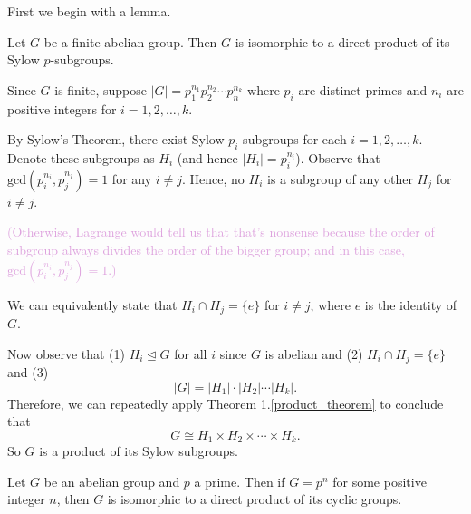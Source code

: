 \documentclass[12pt,letterpaper]{algebra_book}
\newcommand{\normal}{\unlhd}
\theoremstyle{definition}
\begin{document}
    First we begin with a lemma. 

    \begin{lemma}\label{fund_ab_lemma_1}
        Let $G$ be a finite abelian group. Then $G$ is isomorphic to a
        direct product of its Sylow $p$-subgroups.
    \end{lemma}

    \begin{prf}
        Since $G$ is finite, suppose $|G| = p_1^{n_1}p_2^{n_2}\cdots
        p_n^{n_k}$ where $p_i$ are distinct primes and  $n_i$ are positive
        integers for $i = 1, 2, \dots, k$.

        By Sylow's Theorem, there exist Sylow $p_i$-subgroups for each
        $i = 1, 2, \dots, k$. Denote these subgroups as $H_i$ (and
        hence $|H_i| = p_i^{n_i}$). Observe that $\mbox{gcd}(p_i^{n_i}, p_j^{n_j})
        = 1$ for any $i \ne j$. Hence, no $H_i$ is a subgroup of any
        other $H_j$ for $i \ne j$. 
        
        \textcolor{Plum}{(Otherwise, Lagrange would tell us
        that that's nonsense because the order of subgroup always
        divides the order of the bigger group; and in this case, $\mbox{gcd}(p_i^{n_i}, p_j^{n_j})
        = 1$.)}

        We can equivalently state that $H_i \cap H_j = \{e\}$ for $i
        \ne j$, where $e$ is the identity of $G$.

        Now observe that (1) $H_i \normal G$ for all $i$ since $G$ is
        abelian and (2) $H_i \cap H_j = \{e\}$ and (3) 
        \[ 
            |G| = |H_1|\cdot|H_2|\cdots|H_k|.
        \]
        Therefore, we can repeatedly apply Theorem
        1.\ref{product_theorem} to conclude that 
        \[
            G \cong H_1 \times H_2 \times \cdots \times H_k.           
        \]
        So $G$ is a product of its Sylow subgroups.
    \end{prf}

    \begin{lemma}\label{fund_ab_lemma_2}
        Let $G$ be an abelian group and $p$ a prime. Then if $G = p^n$ for some
        positive integer $n$, then $G$ is isomorphic to a direct
        product of its cyclic groups.
    \end{lemma}
\end{document}
